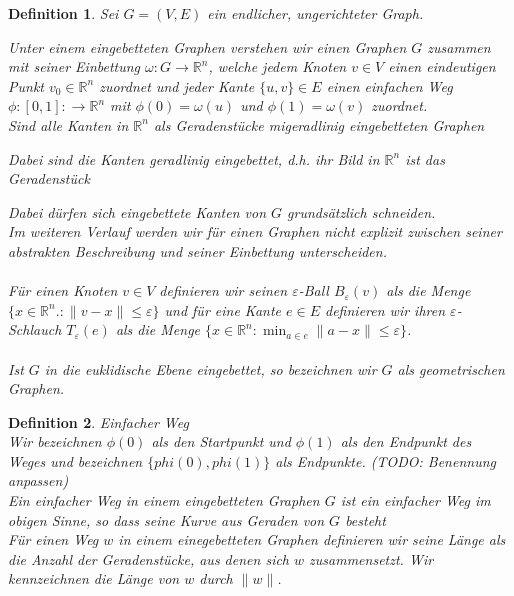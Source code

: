 \documentclass[a4paper, 12pt, twoside]{article}
\theoremstyle{Format1} %
\newtheorem{Def}{Definition}[section]       %
\begin{document}
\begin{Def}
	Sei $G=(V,E)$ ein endlicher, ungerichteter Graph.

	Unter einem \textit{eingebetteten Graphen} verstehen wir einen Graphen $G$
	zusammen mit seiner \textit{Einbettung} $\omega: G \to \mathbb{R}^n$, welche
	jedem Knoten $v \in V$ einen eindeutigen Punkt $v_0 \in \mathbb{R}^n$ zuordnet und jeder Kante $\{u,v\} \in E$
	einen einfachen Weg $\phi: [0,1]: \to \mathbb{R}^n$ mit $\phi(0) = \omega(u)$ und $\phi(1) = \omega(v)$ zuordnet.
	\\
	Sind alle Kanten in $\mathbb{R}^n$ als Geradenstücke mi\textit{geradlinig eingebetteten Graphen}

	Dabei sind die Kanten {geradlinig} eingebettet, d.h. ihr Bild in $\mathbb{R}^n$ ist das Geradenstück

	Dabei dürfen sich eingebettete Kanten von $G$ grundsätzlich schneiden.
	\\
	Im weiteren Verlauf werden wir für einen Graphen nicht explizit zwischen seiner abstrakten Beschreibung und seiner Einbettung unterscheiden.
	\\
	\\
	Für einen Knoten $v \in V$ definieren wir seinen \textit{$\varepsilon$-Ball} $B_{\varepsilon}(v)$ als die Menge
	$\{x \in \mathbb{R}^n.: \|v-x\| \leq \varepsilon\}$
	und für eine Kante $e \in E$ definieren wir ihren \textit{$\varepsilon$-Schlauch} $T_{\varepsilon}(e)$ als die Menge
	$\{x \in \mathbb{R}^n: \min_{a \in e}\|a-x\| \leq \varepsilon\}$.
	\\
	\\
	Ist $G$ in die euklidische Ebene eingebettet, so bezeichnen wir $G$ als \textit{geometrischen Graphen}.
\end{Def}

\begin{Def}
	Einfacher Weg
	\\
	Wir bezeichnen $\phi(0)$ als den \textit{Startpunkt} und $\phi(1)$ als den \textit{Endpunkt} des Weges und bezeichnen
	$\{phi(0), phi(1)\}$ als Endpunkte. (TODO: Benennung anpassen)
	\\
	Ein einfacher Weg in einem eingebetteten Graphen $G$ ist ein einfacher Weg im obigen Sinne, so dass
	seine Kurve aus Geraden von $G$ besteht
	\\
	Für einen Weg $w$ in einem einegebetteten Graphen definieren wir seine \textit{Länge} als die Anzahl der Geradenstücke, aus
	denen sich $w$ zusammensetzt. Wir kennzeichnen die Länge von $w$ durch $\|w\|$.
\end{Def}
\end{document}
